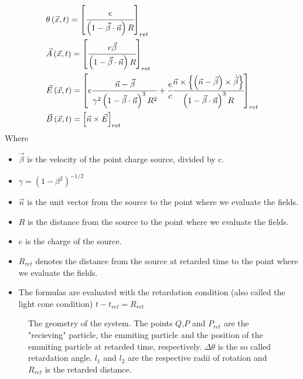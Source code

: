 \documentclass[11pt,a4paper]{article}
\begin{document}
\begin{subequations}
\begin{align}
&\theta\left(\vec{x},t\right)=\left[\cfrac{e}{\left(1-\vec{\beta}\cdot\vec{n}\right)R}\right]_{ret}\\
&\vec{A}\left(\vec{x},t\right)=\left[\cfrac{e\vec{\beta}}{\left(1-\vec{\beta}\cdot\vec{n}\right)R}\right]_{ret}\\
&\vec{E}\left(\vec{x},t\right)=\left[e\cfrac{\vec{n}-\vec{\beta}}{\gamma^{2}\left(1-\vec{\beta}\cdot\vec{n}\right)^{3}R^{2}}+\cfrac{e}{c}\cfrac{\vec{n}\times\left\{ \left(\vec{n}-\vec{\beta}\right)\times\dot{\vec{\beta}}\right\} }{\left(1-\vec{\beta}\cdot\vec{n}\right)^{3}R}\right]_{ret}\\
&\vec{B}\left(\vec{x},t\right)=\left[\vec{n}\times\vec{E}\right]_{ret}
\end{align}
\end{subequations}
Where 
\begin{itemize}
\item $\vec{\beta} $ is the velocity of the point charge source, divided by c.
\item $\gamma=\left(1-\beta^{2}\right)^{-1/2}$
\item $\vec{n}$ is the unit vector from the source to the point where we evaluate the fields.
\item $R$ is the distance from the source to the point where we evaluate the fields.
\item $e$ is the charge of the source.
\item $R_{ret}$ denotes the distance from the source at retarded time to the point where we evaluate the fields.
\item The formulas are evaluated with the retardation condition (also called the light cone condition) $t-t_{ret}=R_{ret}$
\end{itemize}
\begin{figure}[h]
\centering
{}
\caption{The geometry of the system. The points $Q$,$P$ and $P_{ret}$ are the "recieving" particle, the emmiting particle and the position of the emmiting particle at retarded time, respectively. $\Delta\theta$ is the so called retardation angle. $l_1$ and $l_2$ are the respective radii of rotation and $R_{ret}$ is the retarded distance.}
\label{fig:geometry}
\end{figure}
\end{document}
